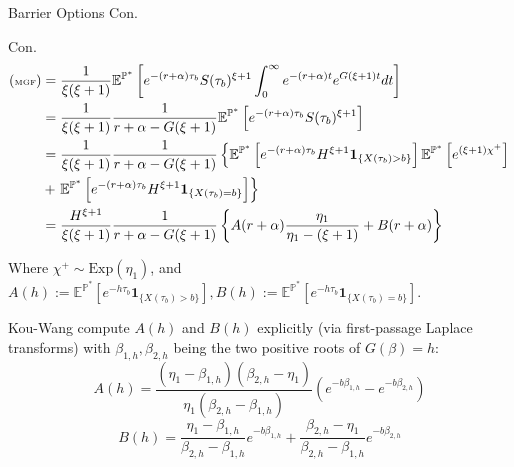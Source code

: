 \documentclass{beamer}
\begin{document}
\begin{frame}{Barrier Options Con.}

    {\footnotesize \scriptsize
    \par Con.
    \begin{align*}
         {\footnotesize \tiny(\text{MGF})}  &=\frac{1}{\xi (\xi + 1)} \mathbb{E}^{\mathbb{P}^*} \left[ e^{-(r + \alpha) \tau_b} 
            S(\tau_b)^{\xi+1} \int_0^\infty e^{-(r+\alpha)t} e^{G(\xi+1)t} dt 
           \right]\\
        & = \frac{1}{\xi(\xi+1)} \frac{1}{r + \alpha - G(\xi+1)} \mathbb{E}^{\mathbb{P}^*} \left[ e^{-(r+\alpha) \tau_b} S(\tau_b)^{\xi+1} \right]\\
        &= \frac{1}{\xi(\xi+1)} \frac{1}{r + \alpha - G(\xi+1)} \left\{\mathbb{E}^{\mathbb{P}^*} \left[ e^{-(r+\alpha) \tau_b} H^{\xi+1} \mathbf{1}_{\{X(\tau_b)>b\}} \right] 
        \mathbb{E}^{\mathbb{P}^*} \left[ e^{(\xi+1)\chi^+} \right]\right. \\
        & +\left. \mathbb{E}^{\mathbb{P}^*} \left[ e^{-(r+\alpha) \tau_b} H^{\xi+1} \mathbf{1}_{\{X(\tau_b)=b\}} \right] \right\}\\
        & = \frac{H^{\xi+1}}{\xi(\xi+1)} \frac{1}{r + \alpha - G(\xi+1)} 
        \left\{ A(r + \alpha) \frac{\eta_1}{\eta_1 - (\xi+1)} + B(r + \alpha) \right\}
    \end{align*}
    \par Where \( \chi^+ \sim \text{Exp}(\eta_1) \), and $A(h) := \mathbb{E}^{\mathbb{P}^*} [e^{-h\tau_b} \mathbf{1}_{\{X(\tau_b) > b\}}],  B(h) := \mathbb{E}^{\mathbb{P}^*} [e^{-h\tau_b} \mathbf{1}_{\{X(\tau_b) = b\}}].$
    \par Kou-Wang compute \( A(h) \) and \( B(h) \) explicitly (via first-passage Laplace transforms) with \(\beta_{1,h}, \beta_{2,h}\) being the two positive roots of \( G(\beta) = h\):
        \[
        A(h) = \frac{(\eta_1 - \beta_{1,h})(\beta_{2,h} - \eta_1)}{\eta_1 (\beta_{2,h} - \beta_{1,h})} \left( e^{-b\beta_{1,h}} - e^{-b\beta_{2,h}} \right)
        \]
        \[
        B(h) = \frac{\eta_1 - \beta_{1,h}}{\beta_{2,h} - \beta_{1,h}} e^{-b\beta_{1,h}} + \frac{\beta_{2,h} - \eta_1}{\beta_{2,h} - \beta_{1,h}} e^{-b\beta_{2,h}}
        \]
    }
\end{frame}
\end{document}
